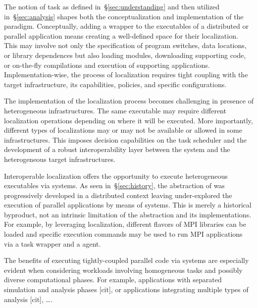 \documentclass{sig-alternate}
\begin{document}

The notion of task as defined in~\S\ref{sec:understanding} and then utilized
in~\S\ref{sec:analysis} shapes both the conceptualization and implementation of
the \pilot paradigm. Conceptually, adding a wrapper to the executables of a
distributed or parallel application means creating a well-defined space for
their localization. This may involve not only the specification of program
switches, data locations, or library dependences but also loading modules,
downloading supporting code, or on-the-fly compilations and execution of
supporting applications. Implementation-wise, the process of localization
requires tight coupling with the target infrastructure, its capabilities,
policies, and specific configurations.

The implementation of the localization process becomes challenging in presence
of heterogeneous infrastructures. The same executable may require different
localization operations depending on where it will be executed. More
importantly, different types of localizations may or may not be available or
allowed in some infrastructures. This imposes decision capabilities on the task
scheduler and the development of a robust interoperability layer between the
\pilot system and the heterogeneous target infrastructures.

Interoperable localization offers the opportunity to execute heterogeneous
executables via \pilot systems. As seen in~\S\ref{sec:history}, the abstraction
of \pilot was progressively developed in a distributed context leaving
under-explored the execution of parallel applications by means of \pilot
systems. This is merely a historical byproduct, not an intrinsic limitation of
the \pilot abstraction and its implementations. For example, by leveraging
localization, different flavors of MPI libraries can be loaded and specific
execution commands may be used to run MPI applications via a task wrapper and a
\pilot agent.

The benefits of executing tightly-coupled parallel code via \pilot systems are
especially evident when considering workloads involving homogeneous tasks and
possibly diverse computational phases. For example, applications with separated
simulation and analysis phases [cit], or applications integrating multiple
types of analysis [cit], \ldots.
\end{document}
